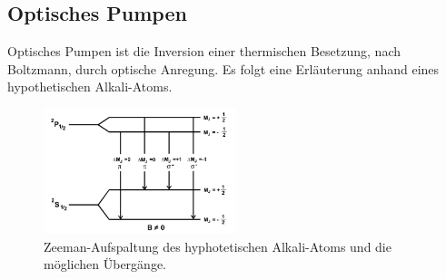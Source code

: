 \subsection{Optisches Pumpen}
Optisches Pumpen ist die Inversion einer thermischen Besetzung, nach Boltzmann, durch optische Anregung.
Es folgt eine Erläuterung anhand eines hypothetischen Alkali-Atoms.
\begin{figure}
    \centering
    \includegraphics[width=0.5\textwidth]{Uebergang.PNG}
    \caption{Zeeman-Aufspaltung des hyphotetischen Alkali-Atoms und die möglichen Übergänge.\cite{skript}}
    \label{fig:Uebergang}
\end{figure}

